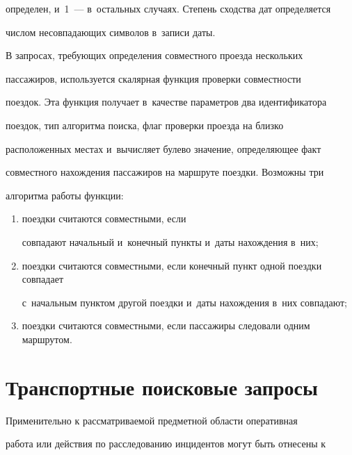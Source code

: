 определен, и~1~--- в~остальных случаях. Степень сходства дат определяется 


числом несовпадающих символов в~записи даты.


      


      В запросах, требующих определения совместного проезда нескольких 


пассажиров, используется скалярная функция проверки совместности 


поездок. Эта функция получает в~качестве параметров два идентификатора 


поездок, тип алгоритма поиска, флаг проверки проезда на близко 


расположенных местах и~вы\-чис\-ля\-ет булево значение, определяющее факт 


совместного нахождения пассажиров на маршруте поездки. Возможны три 


алгоритма работы функции:


\begin{enumerate}[(1)]


\item %


поездки считаются совместными, если 


совпадают начальный и~конечный пункты и~даты нахождения в~них; 


\item %


поездки считаются совместными, если конечный пункт одной поездки совпа\-да\-ет 


с~начальным пунктом другой поездки и~даты нахождения в~них совпадают; 


\item %


поездки считаются совместными, если пассажиры следовали одним маршрутом.


\end{enumerate}





\section{Транспортные поисковые запросы}


      


 Применительно к рассматриваемой предметной области оперативная 


работа или действия по расследованию инцидентов могут быть отнесены к 


